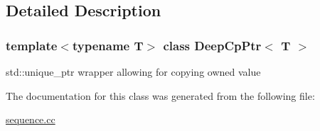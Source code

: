 \subsection{Detailed Description}
\subsubsection*{template$<$typename T$>$\newline
class Deep\+Cp\+Ptr$<$ T $>$}

std\+::unique\+\_\+ptr wrapper allowing for copying owned value 

The documentation for this class was generated from the following file\+:\begin{DoxyCompactItemize}
\item 
\mbox{\hyperlink{sequence_8cc}{sequence.\+cc}}\end{DoxyCompactItemize}
